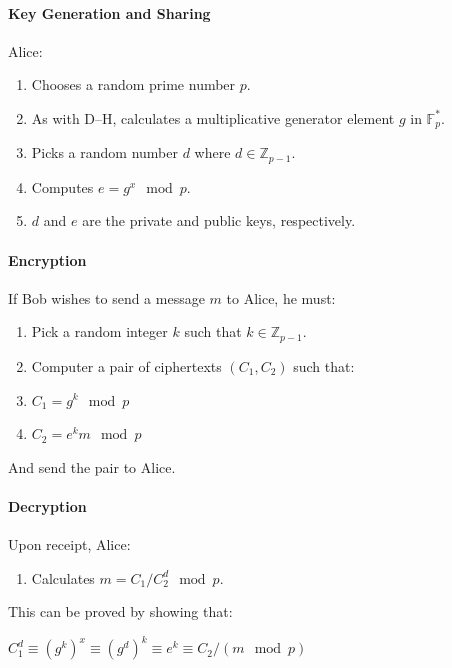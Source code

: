   \paragraph{Key Generation and Sharing}
  
  Alice:
  
  \begin{enumerate}
    \item Chooses a random prime number $p$.
    \item As with D--H, calculates a multiplicative generator element $g$ in $\mathbb{F}_p^*$.
    \item Picks a random number $d$ where $d \in \mathbb{Z}_{p-1}$.
    \item Computes $e = g^x\mod p$.
    \item $d$ and $e$ are the private and public keys, respectively.
  \end{enumerate}
  
  \paragraph{Encryption}
  
  If Bob wishes to send a message $m$ to Alice,  he must:
  
  \begin{enumerate}
    \item Pick a random integer $k$ such that $k \in \mathbb{Z}_{p-1}$.
    \item Computer a pair of ciphertexts $(C_1,C_2)$ such that:
    \item $C_1 = g^k \mod p$
    \item $C_2 = e^km \mod p$
  \end{enumerate}
  
  And send the pair to Alice.
  
  \paragraph{Decryption}
  
  Upon receipt, Alice:
  
  \begin{enumerate}
    \item Calculates $m = C_1/C_2^d \mod p$.
  \end{enumerate}
  
  This can be proved by showing that:
  
  \begin{center}
    $C_1^d \equiv (g^k)^x \equiv (g^d)^k \equiv e^k \equiv C_2/(m \mod p)$
  \end{center}
  
